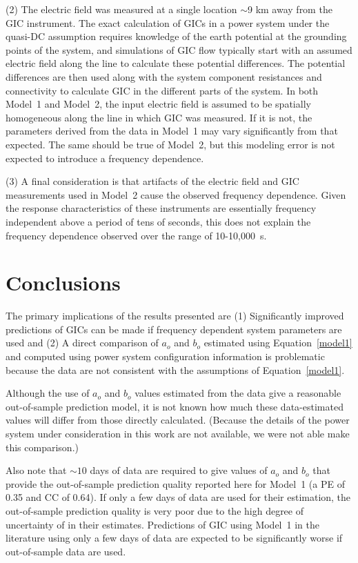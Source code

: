 \documentclass[draft,linenumbers]{agujournal2018}
\begin{document}
(2) The electric field was measured at a single location $\sim$9 km away from the GIC instrument. The exact calculation of GICs in a power system under the quasi-DC assumption requires knowledge of the earth potential at the grounding points of the system, and simulations of GIC flow \citep{Albertson1981,Lehtinen1985} typically start with an assumed electric field along the line to calculate these potential differences. The potential differences are then used along with the system component resistances and connectivity to calculate GIC in the different parts of the system. In both Model~1 and Model~2, the input electric field is assumed to be spatially homogeneous along the line in which GIC was measured. If it is not, the parameters derived from the data in Model~1 may vary significantly from that expected. The same should be true of Model~2, but this modeling error is not expected to introduce a frequency dependence.

(3) A final consideration is that artifacts of the electric field and GIC measurements used in Model~2 cause the observed frequency dependence. Given the response characteristics of these instruments are essentially frequency independent above a period of tens of seconds, this does not explain the frequency dependence observed over the range of 10-10,000~s.

\section{Conclusions}

The primary implications of the results presented are (1) Significantly improved predictions of GICs can be made if frequency dependent system parameters are used and (2) A direct comparison of $a_o$ and $b_o$ estimated using Equation~\ref{model1} and computed using power system configuration information is problematic because the data are not consistent with the assumptions of Equation~\ref{model1}. 

Although the use of $a_o$ and $b_o$ values estimated from the data give a reasonable out-of-sample prediction model, it is not known how much these data-estimated values will differ from those directly calculated. (Because the details of the power system under consideration in this work are not available, we were not able make this comparison.)

Also note that $\sim 10$ days of data are required to give values of $a_o$ and $b_o$ that provide the out-of-sample prediction quality reported here for Model~1 (a PE of 0.35 and CC of 0.64). If only a few days of data are used for their estimation, the out-of-sample prediction quality is very poor due to the high degree of uncertainty of in their estimates. Predictions of GIC using Model~1 in the literature using only a few days of data are expected to be significantly worse if out-of-sample data are used.
\end{document}
